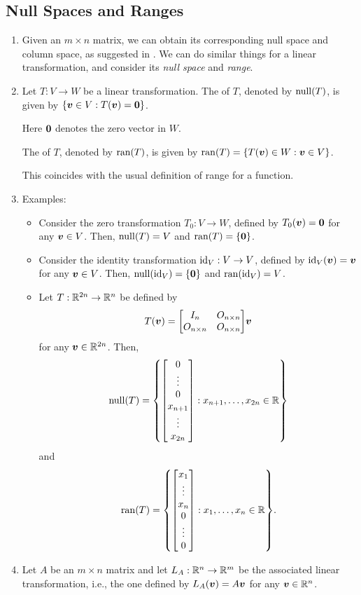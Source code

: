 \subsection{Null Spaces and Ranges}
\begin{enumerate}
\item Given an \(m\times n\) matrix, we can obtain its corresponding null space
and column space, as suggested in . We
can do similar things for a linear transformation, and consider its \emph{null
space} and \emph{range}.

\item Let \(T:V\to W\) be a linear transformation. The  of
\(T\), denoted by \(\operatorname{null}(T)\), is given by \(\{\vb*{v}\in V:T(\vb*{v})=\vb*{0}\}\).
\begin{note}
Here \(\vb*{0}\) denotes the zero vector in \(W\).
\end{note}

The  of \(T\), denoted by \(\operatorname{ran}(T)\), is given by
\(\operatorname{ran}(T)=\{T(\vb*{v})\in W:\vb*{v}\in V\}\). \begin{note} This coincides
with the usual definition of range for a function.
\end{note}

\item Examples:
\begin{itemize}
\item Consider the zero transformation \(T_0:V\to W\), defined by
\(T_0(\vb*{v})=\vb*{0}\) for any \(\vb*{v}\in V\). Then, \(\operatorname{null}(T)=V\) and
\(\operatorname{ran}(T)=\{\vb*{0}\}\).
\item Consider the identity transformation \(\operatorname{id}_{V}:V\to V\), defined by
\(\operatorname{id}_{V}(\vb*{v})=\vb*{v}\) for any \(\vb*{v}\in V\). Then,
\(\operatorname{null}(\operatorname{id}_{V})=\{\vb*{0}\}\) and \(\operatorname{ran}(\operatorname{id}_{V})=V\).
\item Let \(T:\mathbb{R}^{2n}\to\mathbb{R}^n\) be defined by
\[
T(\vect{v})=\mqty[I_n&O_{n\times n}\\ O_{n\times n}&O_{n\times n}]\vect{v}
\]
for any \(\vb*{v}\in\mathbb{R}^{2n}\). Then,
\[
\nul{T}=\qty{\mqty[0\\ \vdots\\0\\ x_{n+1}\\ \vdots\\ x_{2n}]:x_{n+1},\dotsc,x_{2n}\in\R}
\]
and
\[
\ran{T}=\qty{\mqty[x_1\\ \vdots\\x_n\\ 0\\ \vdots\\ 0]:x_{1},\dotsc,x_{n}\in\R}.
\]
\end{itemize}
\item \label{it:null-ran-relate-matx-sp}
Let \(A\) be an \(m\times n\) matrix and let \(L_A:\mathbb{R}^{n}\to\mathbb{R}^{m}\) be the
associated linear transformation, i.e., the one defined by
\(L_A(\vb*{v})=A\vb*{v}\) for any \(\vb*{v}\in\mathbb{R}^n\).


\end{enumerate}
